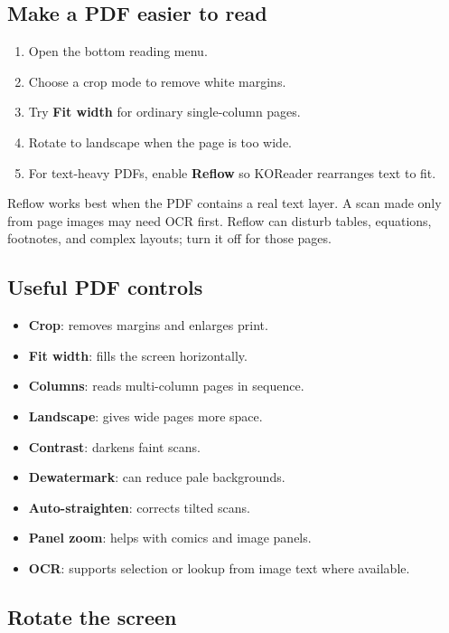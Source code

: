 \documentclass[10pt,letterpaper]{article}
\begin{document}
\subsection{Make a PDF easier to read}

\begin{enumerate}
  \item Open the bottom reading menu.
  \item Choose a crop mode to remove white margins.
  \item Try \textbf{Fit width} for ordinary single-column pages.
  \item Rotate to landscape when the page is too wide.
  \item For text-heavy PDFs, enable \textbf{Reflow} so KOReader rearranges text to fit.
\end{enumerate}

Reflow works best when the PDF contains a real text layer. A scan made only from page images may need OCR first. Reflow can disturb tables, equations, footnotes, and complex layouts; turn it off for those pages.

\subsection{Useful PDF controls}

\begin{itemize}
  \item \textbf{Crop}: removes margins and enlarges print.
  \item \textbf{Fit width}: fills the screen horizontally.
  \item \textbf{Columns}: reads multi-column pages in sequence.
  \item \textbf{Landscape}: gives wide pages more space.
  \item \textbf{Contrast}: darkens faint scans.
  \item \textbf{Dewatermark}: can reduce pale backgrounds.
  \item \textbf{Auto-straighten}: corrects tilted scans.
  \item \textbf{Panel zoom}: helps with comics and image panels.
  \item \textbf{OCR}: supports selection or lookup from image text where available.
\end{itemize}

\subsection{Rotate the screen}
\end{document}
